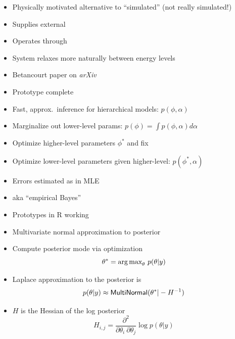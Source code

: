 \documentclass[10pt]{report}
\begin{document}
%
\begin{itemize}
\item Physically motivated alternative to ``simulated''
   (not really simulated!)
\item Supplies external 
\item Operates through 
\item System relaxes more naturally between energy levels
\item Betancourt paper on {\slshape arXiv}
  \vfill
\item Prototype complete
\end{itemize}


%
\begin{itemize}
\item Fast, approx.\ inference for hierarchical models: $p(\phi, \alpha)$
\item Marginalize out lower-level params: $p(\phi) = \int p(\phi, \alpha) d\alpha$
\item Optimize higher-level parameters $\phi^*$ and fix
\item Optimize lower-level parameters given higher-level: $p(\phi^*, \alpha)$
\item Errors estimated as in MLE
\item aka ``empirical Bayes''
\item Prototypes in R working
\end{itemize}


%
\begin{itemize}
\item Multivariate normal approximation to posterior
\item Compute posterior mode via optimization
\[
\theta^{*} = \mbox{arg\,max}_{\theta} \  p(\theta | y)
\]
\item Laplace approximation to the posterior is
\[
p(\theta | y)
\approx
\text{\sf MultiNormal}(\theta^{*} | -H^{-1})
\]
\item $H$ is the Hessian of the log posterior
\[
H_{i,j}
= \frac{\partial^2}{\partial \theta_i \ \partial \theta_j}
  \log p(\theta | y)
\]
\end{itemize}
\end{document}
